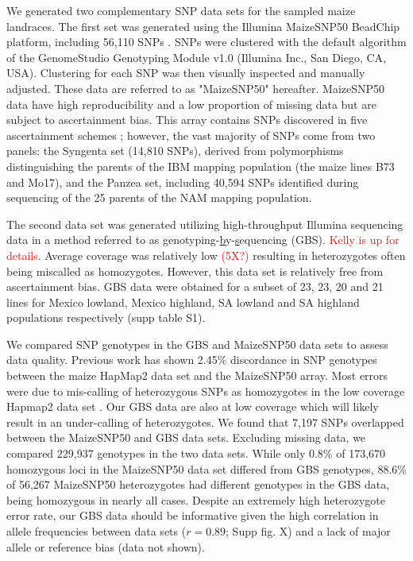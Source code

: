 We generated two complementary SNP data sets for the sampled maize landraces. 
The first set was generated using the Illumina MaizeSNP50 BeadChip platform, including 56,110
SNPs \cite[]{Ganal_2011_22174790}.  SNPs were clustered with the default algorithm of the GenomeStudio Genotyping Module v1.0 (Illumina Inc., San Diego, CA, USA).   
Clustering for each SNP was then visually inspected and manually adjusted.  
These data are referred to as "MaizeSNP50" hereafter.  
MaizeSNP50 data have high reproducibility and a low proportion of missing data but are subject to ascertainment bias. 
This array contains SNPs discovered in five ascertainment schemes \cite[]{Ganal_2011_22174790}; however, the vast majority of SNPs come from two panels: the Syngenta set (14,810 SNPs), derived from polymorphisms distinguishing the parents of the IBM mapping population (the maize lines B73 and Mo17), and the Panzea set, including 40,594 SNPs identified during sequencing of the 25 parents of the NAM mapping population.  

The second data set was generated utilizing high-throughput Illumina sequencing data in a method referred to as \underline{g}enotyping-\underline{b}y-\underline{s}equencing (GBS).  \textcolor{red}{Kelly is up for details.}
Average coverage was relatively low \textcolor{red}{(5X?)}  resulting in heterozygotes often being miscalled as homozygotes.  However, this data set is relatively free from ascertainment bias.       
GBS data were obtained for a subset of 23, 23, 20 and 21 lines for Mexico lowland, Mexico highland, SA lowland and SA highland populations respectively (supp table S1).


We compared SNP genotypes in the GBS and MaizeSNP50 data sets to assess data quality. 
Previous work has shown 2.45\% discordance in SNP genotypes between the maize HapMap2 data set and the MaizeSNP50 array. 
Most errors were due to mis-calling of heterozygous SNPs as homozygotes in the low coverage Hapmap2 data set \cite[]{Hufford_2012_22660546}. 
Our GBS data are also at low coverage which will likely result in an under-calling of heterozygotes.
We found that 7,197 SNPs overlapped between the MaizeSNP50 and GBS data sets. 
Excluding missing data, we compared 229,937 genotypes in the two data sets. 
While only 0.8\% of 173,670 homozygous loci in the MaizeSNP50 data set differed from GBS genotypes,
88.6\% of 56,267 MaizeSNP50 heterozygotes had different genotypes in the GBS data, being homozygous in nearly all cases. 
Despite an extremely high heterozygote error rate, our GBS data should be informative given the high correlation in allele frequencies between data sets ($r=0.89$; Supp fig. X) and a lack of major allele or reference bias (data not shown).


